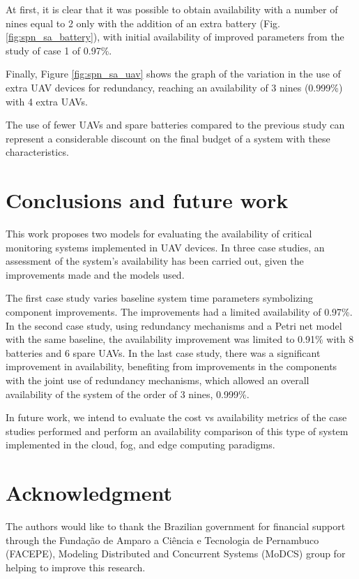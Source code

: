 \documentclass[conference]{IEEEtran}
\begin{document}
At first, it is clear that it was possible to obtain availability with a number of nines equal to 2 only with the addition of an extra battery (Fig.\ref{fig:spn_sa_battery}), with initial availability of improved parameters from the study of case 1 of 0.97\%.

Finally, Figure \ref{fig:spn_sa_uav} shows the graph of the variation in the use of extra UAV devices for redundancy, reaching an availability of 3 nines (0.999\%) with 4 extra UAVs. 

The use of fewer UAVs and spare batteries compared to the previous study can represent a considerable discount on the final budget of a system with these characteristics.




\section{Conclusions and future work}\label{sec:conclusions}

This work proposes two models for evaluating the availability of critical monitoring systems implemented in UAV devices. In three case studies, an assessment of the system's availability has been carried out, given the improvements made and the models used. 

The first case study varies baseline system time parameters symbolizing component improvements. The improvements had a limited availability of 0.97\%. In the second case study, using redundancy mechanisms and a Petri net model with the same baseline, the availability improvement was limited to 0.91\% with 8 batteries and 6 spare UAVs. In the last case study, there was a significant improvement in availability, benefiting from improvements in the components with the joint use of redundancy mechanisms, which allowed an overall availability of the system of the order of 3 nines, 0.999\%.

In future work, we intend to evaluate the cost vs availability metrics of the case studies performed and perform an availability comparison of this type of system implemented in the cloud, fog, and edge computing paradigms.


\section*{Acknowledgment}\label{sec:acknowledgment}
The authors would like to thank the Brazilian government for financial support through the Fundação de Amparo a Ciência e Tecnologia de Pernambuco (FACEPE), Modeling Distributed and Concurrent Systems (MoDCS) group for helping to improve this research.




\end{document}

